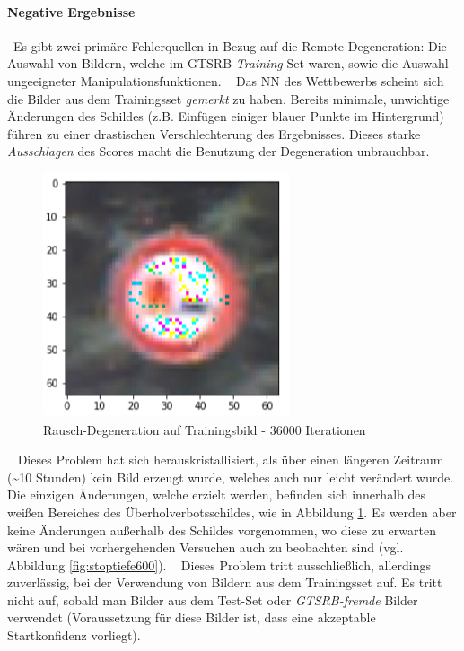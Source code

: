 \paragraph{Negative Ergebnisse} ~\newline Es gibt zwei primäre Fehlerquellen in Bezug auf die Remote-Degeneration: 
Die Auswahl von Bildern, welche im GTSRB-\textit{Training}-Set waren, sowie die Auswahl ungeeigneter Manipulationsfunktionen. 
~\newline
Das \ac{NN} des Wettbewerbs scheint sich die Bilder aus dem Trainingsset \textit{gemerkt} zu haben. 
Bereits minimale, unwichtige Änderungen des Schildes (z.B. Einfügen einiger blauer Punkte im Hintergrund) führen zu einer drastischen Verschlechterung des Ergebnisses. 
Dieses starke \textit{Ausschlagen} des Scores macht die Benutzung der Degeneration unbrauchbar.
\begin{figure}[h]
	\centering
	\includegraphics[width=0.5\linewidth]{Images/DegenSamples/OverFitSmaller}
	\caption[Degeneration overfit]{Rausch-Degeneration auf Trainingsbild - 36000 Iterationen}
	\label{fig:DegenOverfit}
\end{figure}
~\newline
Dieses Problem hat sich herauskristallisiert, als über einen längeren Zeitraum (\textasciitilde  10 Stunden) kein Bild erzeugt wurde, welches auch nur leicht verändert wurde. 
Die einzigen Änderungen, welche erzielt werden, befinden sich innerhalb des weißen Bereiches des Überholverbotsschildes, wie in Abbildung \ref{fig:DegenOverfit}. 
Es werden aber keine Änderungen außerhalb des Schildes vorgenommen, wo diese zu erwarten wären und bei vorhergehenden Versuchen auch zu beobachten sind (vgl. Abbildung \ref{fig:stoptiefe600}). 
~\newline
Dieses Problem tritt ausschließlich, allerdings zuverlässig, bei der Verwendung von Bildern aus dem Trainingsset auf. 
Es tritt nicht auf, sobald man Bilder aus dem Test-Set oder \textit{GTSRB-fremde} Bilder verwendet (Voraussetzung für diese  Bilder ist, dass eine akzeptable Startkonfidenz vorliegt). 

